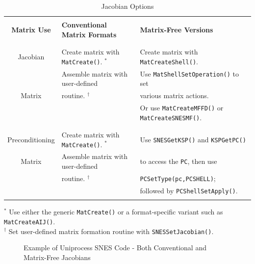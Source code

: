 \begin{center}
\begin{table}[H]
\begin{tabular}{|c|l|l|} \hline
& & \\
{\bf Matrix Use} & {\bf Conventional Matrix Formats}                & {\bf Matrix-Free Versions}\\
& & \\ \hline
& & \\
Jacobian         & Create matrix with \lstinline|MatCreate()|. $^*$ & Create matrix with \lstinline|MatCreateShell()|.\\
                 & Assemble matrix with user-defined                & Use \lstinline|MatShellSetOperation()| to set\\
Matrix           & routine. $ ^\dagger $                            & various matrix actions.\\
                 &                                                  & Or use \lstinline|MatCreateMFFD()| or \lstinline|MatCreateSNESMF()|.\\
& & \\ \hline
& & \\
Preconditioning  & Create matrix with \lstinline|MatCreate()|. $^*$ & Use \lstinline|SNESGetKSP()| and \lstinline|KSPGetPC()| \\
Matrix           & Assemble matrix with user-defined                & to access the \lstinline|PC|, then use\\
                 & routine. $ ^\dagger $                            & \lstinline|PCSetType(pc,PCSHELL)|;\\
                 &                                                  & followed by \lstinline|PCShellSetApply()|. \\

& & \\ \hline
\end{tabular}

\medskip
$^*$ Use either the generic \lstinline|MatCreate()| or a format-specific variant
   such as \lstinline|MatCreateAIJ()|.\\
$^\dagger$ Set user-defined matrix formation routine with \lstinline{SNESSetJacobian()}.
\medskip
\caption{Jacobian Options}
\label{tab_jacobians}
\end{table}
\end{center}

\begin{figure}[H]

\caption{Example of Uniprocess SNES Code - Both Conventional and Matrix-Free Jacobians}
\label{fig_snesexample2}
\end{figure}

